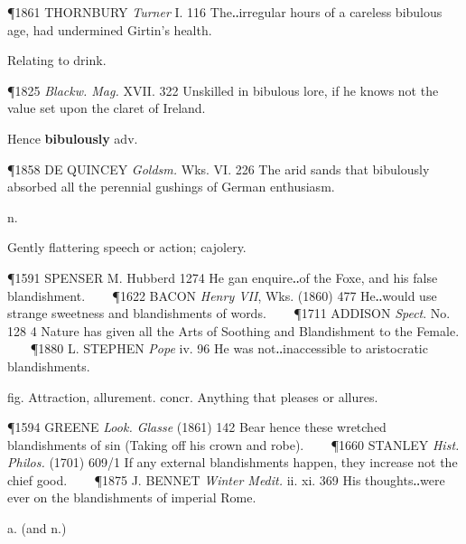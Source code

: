 \begin{description}[wide, labelwidth=!, labelindent=0pt]
\begin{myenumerate}
\P 1861 THORNBURY  \textit{Turner} I. 116 The‥irregular hours of a careless bibulous age, had undermined Girtin's health.

 Relating to drink.

\P 1825  \textit{Blackw. Mag.} XVII. 322 Unskilled in bibulous lore, if he knows not the value set upon the claret of Ireland.

\vspace{0.1cm} \noindent
Hence \textbf{bibulously} adv.

\P 1858 DE QUINCEY  \textit{Goldsm.} Wks. VI. 226 The arid sands that bibulously absorbed all the perennial gushings of German enthusiasm.
\end{myenumerate}


 n.

\noindent {}

\vspace{-0.3cm}

\begin{myenumerate}

 Gently flattering speech or action; cajolery.

\P 1591 SPENSER M. Hubberd 1274 He gan enquire‥of the Foxe, and his false blandishment.    
\P 1622 BACON  \textit{Henry VII}, Wks. (1860) 477 He‥would use strange sweetness and blandishments of words.    
\P 1711 ADDISON  \textit{Spect}. No. 128 4 Nature has given all the Arts of Soothing and Blandishment to the Female.    
\P 1880 L. STEPHEN  \textit{Pope} iv. 96 He was not‥inaccessible to aristocratic blandishments.

 fig. Attraction, allurement. concr. Anything that pleases or allures.

\P 1594 GREENE  \textit{Look. Glasse} (1861) 142 Bear hence these wretched blandishments of sin (Taking off his crown and robe).    
\P 1660 STANLEY  \textit{Hist. Philos.} (1701) 609/1 If any external blandishments happen, they increase not the chief good.    
\P 1875 J. BENNET  \textit{Winter Medit.} ii. xi. 369 His thoughts‥were ever on the blandishments of imperial Rome.
\end{myenumerate}


 a. (and n.)

\noindent {}

\vspace{-0.3cm}


\end{description}
